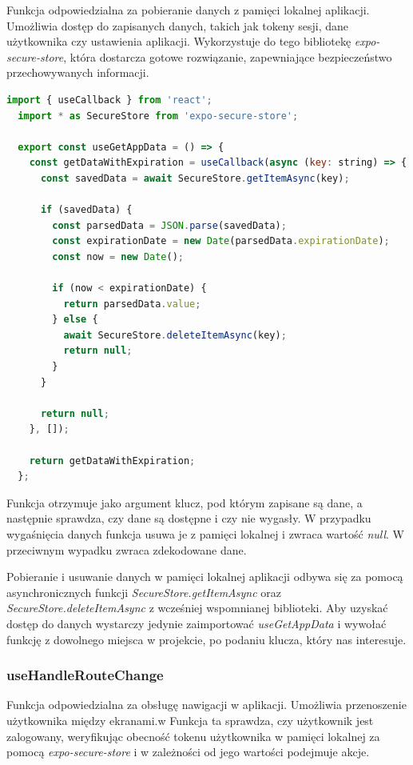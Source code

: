 Funkcja odpowiedzialna za pobieranie danych z pamięci lokalnej aplikacji. Umożliwia dostęp do zapisanych danych, takich jak tokeny sesji, dane użytkownika czy ustawienia aplikacji. Wykorzystuje do tego bibliotekę \textit{expo-secure-store}, która dostarcza gotowe rozwiązanie, zapewniające bezpieczeństwo przechowywanych informacji. 
    
\begin{lstlisting}[language=JavaScript, caption=useGetAppDataHook, label=lst:hook]
  import { useCallback } from 'react';
  import * as SecureStore from 'expo-secure-store';
  
  export const useGetAppData = () => {
    const getDataWithExpiration = useCallback(async (key: string) => {
      const savedData = await SecureStore.getItemAsync(key);
  
      if (savedData) {
        const parsedData = JSON.parse(savedData);
        const expirationDate = new Date(parsedData.expirationDate);
        const now = new Date();
  
        if (now < expirationDate) {
          return parsedData.value;
        } else {
          await SecureStore.deleteItemAsync(key);
          return null;
        }
      }
  
      return null;
    }, []);
  
    return getDataWithExpiration;
  };      
\end{lstlisting}

Funkcja otrzymuje jako argument klucz, pod którym zapisane są dane, a następnie sprawdza, czy dane są dostępne i czy nie wygasły. W przypadku wygaśnięcia danych funkcja usuwa je z pamięci lokalnej i zwraca wartość \textit{null}. W przeciwnym wypadku zwraca zdekodowane dane. 

Pobieranie i usuwanie danych w pamięci lokalnej aplikacji odbywa się za pomocą asynchronicznych funkcji \textit{SecureStore.getItemAsync} oraz \textit{SecureStore.deleteItemAsync} z wcześniej wspomnianej biblioteki. Aby uzyskać dostęp do danych wystarczy jedynie zaimportować \textit{useGetAppData} i wywołać funkcję z dowolnego miejsca w projekcie, po podaniu klucza, który nas interesuje.

\subsubsection{useHandleRouteChange} 

Funkcja odpowiedzialna za obsługę nawigacji w aplikacji. Umożliwia przenoszenie użytkownika między ekranami.w Funkcja ta sprawdza, czy użytkownik jest zalogowany, weryfikując obecność tokenu użytkownika w pamięci lokalnej za pomocą \textit{expo-secure-store} i w zależności od jego wartości podejmuje akcje.
      
